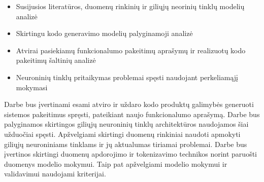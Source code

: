 \documentclass{VUMIFPSbakalaurinis}
\begin{document}
\begin{itemize}
    \item Susijusios literatūros, duomenų rinkinių ir giliųjų neorinių tinklų modelių analizė
    \item Skirtingu kodo generavimo modelių palyginamoji analizė
    \item Atvirai pasiekiamų funkcionalumo pakeitimų aprašymų ir realizuotų kodo pakeitimų šaltinių analizė
    \item Neuroninių tinklų pritaikymas problemai spęsti naudojant perkeliamąjį  mokymasi

\end{itemize}


Darbe bus įvertinami esami atviro ir uždaro kodo produktų galimybės generuoti sistemos pakeitimus spręsti, pateikiant naujo funkcionalumo aprašymą.
Darbe bus palyginamos skirtingos giliųjų neuroninių tinklų architektūros naudojamos šiai užduočiai spęsti.
Apžvelgiami skirtingi duomenų rinkiniai naudoti apmokyti giliųjų neuroniniams tinklams ir jų aktualumas tiriamai problemai.
Darbe bus įvertinos skirtingi duomenų apdorojimo ir tokenizavimo technikos norint paruošti duomenys modelio mokymui.
Taip pat apžvelgiami modelio mokymui ir validavimui naudojami kriterijai.


\end{document}
